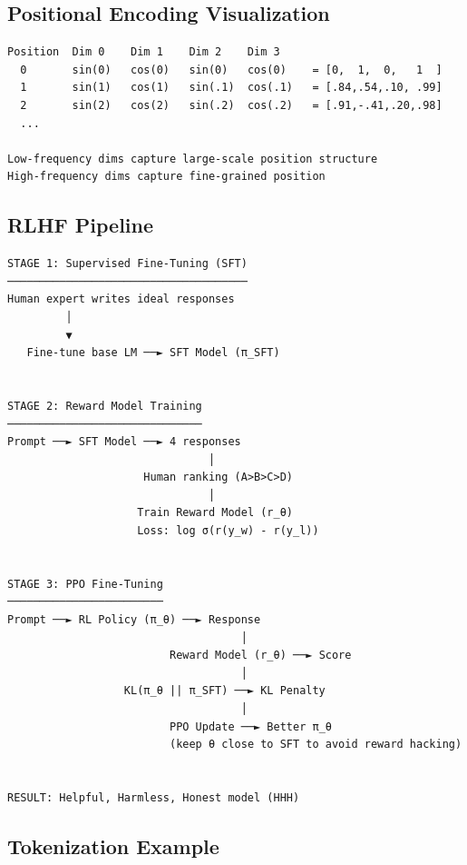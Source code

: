 \documentclass[11pt]{article}
\begin{document}
\subsection{Positional Encoding Visualization}\label{positional-encoding-visualization}

\setcodelang{}

\begin{verbatim}
Position  Dim 0    Dim 1    Dim 2    Dim 3
  0       sin(0)   cos(0)   sin(0)   cos(0)    = [0,  1,  0,   1  ]
  1       sin(1)   cos(1)   sin(.1)  cos(.1)   = [.84,.54,.10, .99]
  2       sin(2)   cos(2)   sin(.2)  cos(.2)   = [.91,-.41,.20,.98]
  ...

Low-frequency dims capture large-scale position structure
High-frequency dims capture fine-grained position
\end{verbatim}

\subsection{RLHF Pipeline}\label{rlhf-pipeline}

\setcodelang{}

\begin{verbatim}
STAGE 1: Supervised Fine-Tuning (SFT)
─────────────────────────────────────
Human expert writes ideal responses
         │
         ▼
   Fine-tune base LM ──► SFT Model (π_SFT)


STAGE 2: Reward Model Training
──────────────────────────────
Prompt ──► SFT Model ──► 4 responses
                               │
                     Human ranking (A>B>C>D)
                               │
                    Train Reward Model (r_θ)
                    Loss: log σ(r(y_w) - r(y_l))


STAGE 3: PPO Fine-Tuning
────────────────────────
Prompt ──► RL Policy (π_θ) ──► Response
                                    │
                         Reward Model (r_θ) ──► Score
                                    │
                  KL(π_θ || π_SFT) ──► KL Penalty
                                    │
                         PPO Update ──► Better π_θ
                         (keep θ close to SFT to avoid reward hacking)


RESULT: Helpful, Harmless, Honest model (HHH)
\end{verbatim}

\subsection{Tokenization Example}\label{tokenization-example}
\end{document}
